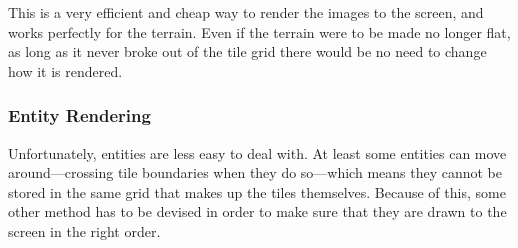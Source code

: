 
This is a very efficient and cheap way to render the images to the screen, and works perfectly for the terrain. Even if the terrain were to be made no longer flat, as long as it never broke out of the tile grid there would be no need to change how it is rendered.

\subsubsection{Entity Rendering}\label{entity_rendering}
Unfortunately, entities are less easy to deal with. At least some entities can move around---crossing tile boundaries when they do so---which means they cannot be stored in the same grid that makes up the tiles themselves. Because of this, some other method has to be devised in order to make sure that they are drawn to the screen in the right order.





